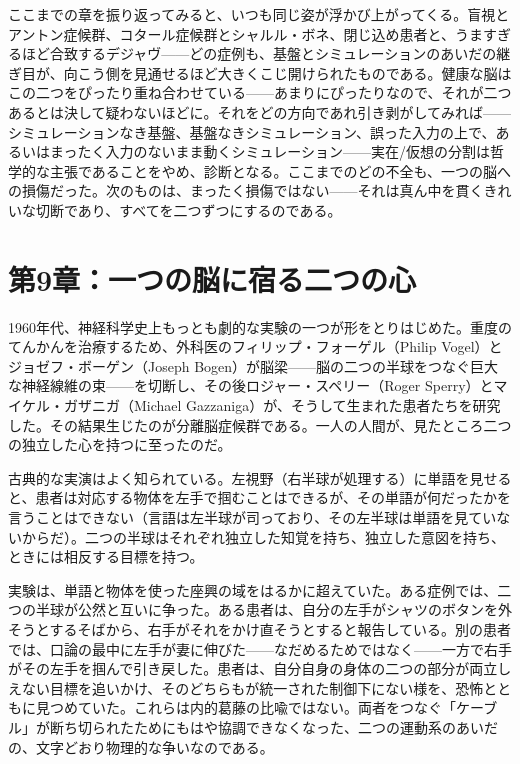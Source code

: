 \documentclass[11pt, twoside, openright]{book}
\begin{document}
ここまでの章を振り返ってみると、いつも同じ姿が浮かび上がってくる。盲視とアントン症候群、コタール症候群とシャルル・ボネ、閉じ込め患者と、うますぎるほど合致するデジャヴ------どの症例も、基盤とシミュレーションのあいだの継ぎ目が、向こう側を見通せるほど大きくこじ開けられたものである。健康な脳はこの二つをぴったり重ね合わせている------あまりにぴったりなので、それが二つあるとは決して疑わないほどに。それをどの方向であれ引き剥がしてみれば------シミュレーションなき基盤、基盤なきシミュレーション、誤った入力の上で、あるいはまったく入力のないまま動くシミュレーション------実在/仮想の分割は哲学的な主張であることをやめ、診断となる。ここまでのどの不全も、一つの脳への損傷だった。次のものは、まったく損傷ではない------それは真ん中を貫くきれいな切断であり、すべてを二つずつにするのである。


\chapter*{第9章：一つの脳に宿る二つの心}

1960年代、神経科学史上もっとも劇的な実験の一つが形をとりはじめた。重度のてんかんを治療するため、外科医のフィリップ・フォーゲル（Philip Vogel）とジョゼフ・ボーゲン（Joseph Bogen）が脳梁------脳の二つの半球をつなぐ巨大な神経線維の束------を切断し、その後ロジャー・スペリー（Roger Sperry）とマイケル・ガザニガ（Michael Gazzaniga）が、そうして生まれた患者たちを研究した。その結果生じたのが分離脳症候群である。一人の人間が、見たところ二つの独立した心を持つに至ったのだ。

古典的な実演はよく知られている。左視野（右半球が処理する）に単語を見せると、患者は対応する物体を左手で掴むことはできるが、その単語が何だったかを言うことはできない（言語は左半球が司っており、その左半球は単語を見ていないからだ）。二つの半球はそれぞれ独立した知覚を持ち、独立した意図を持ち、ときには相反する目標を持つ。

実験は、単語と物体を使った座興の域をはるかに超えていた。ある症例では、二つの半球が公然と互いに争った。ある患者は、自分の左手がシャツのボタンを外そうとするそばから、右手がそれをかけ直そうとすると報告している。別の患者では、口論の最中に左手が妻に伸びた------なだめるためではなく------一方で右手がその左手を掴んで引き戻した。患者は、自分自身の身体の二つの部分が両立しえない目標を追いかけ、そのどちらもが統一された制御下にない様を、恐怖とともに見つめていた。これらは内的葛藤の比喩ではない。両者をつなぐ「ケーブル」が断ち切られたためにもはや協調できなくなった、二つの運動系のあいだの、文字どおり物理的な争いなのである。
\end{document}
